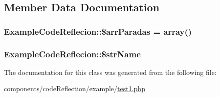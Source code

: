 \subsection{Member Data Documentation}
\hypertarget{class_example_code_reflecion_fb7568004be48ac2a4dba7cd994d0f3e}{
\subsubsection[{\$arrParadas}]{\setlength{\rightskip}{0pt plus 5cm}ExampleCodeReflecion::\$arrParadas = array()}}
\label{class_example_code_reflecion_fb7568004be48ac2a4dba7cd994d0f3e}


\hypertarget{class_example_code_reflecion_b75ae13f02f4bec46f38e2094bf9c0aa}{
\subsubsection[{\$strName}]{\setlength{\rightskip}{0pt plus 5cm}ExampleCodeReflecion::\$strName}}
\label{class_example_code_reflecion_b75ae13f02f4bec46f38e2094bf9c0aa}




The documentation for this class was generated from the following file:\begin{CompactItemize}
\item 
components/codeReflection/example/\hyperlink{code_reflection_2example_2test1_8php}{test1.php}\end{CompactItemize}
